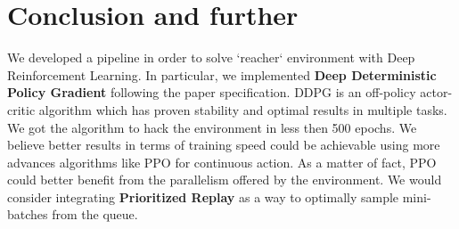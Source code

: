 \documentclass[11pt]{article}
\begin{document}
\section{Conclusion and further}
\label{sec:org8dd118b}
We developed a pipeline in order to solve `reacher` environment with Deep
Reinforcement Learning. In particular, we implemented \textbf{Deep Deterministic Policy
Gradient} following the paper specification. DDPG is an off-policy actor-critic
algorithm which has proven stability and optimal results in multiple tasks. We
got the algorithm to hack the environment in less then 500 epochs. We believe
better results in terms of training speed could be achievable using more
advances algorithms like PPO for continuous action. As a matter of fact, PPO
could better benefit from the parallelism offered by the environment. We would
consider integrating \textbf{Prioritized Replay} as a way to optimally sample
mini-batches from the queue. 
\end{document}
